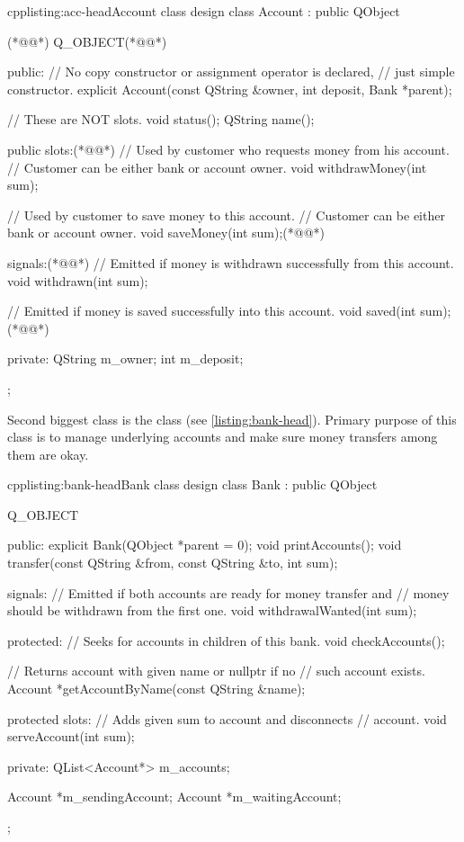 \begin{fdoccode}{cpp}{listing:acc-head}{Account class design}
class Account : public QObject {(*@\label{listing:qobj1}@*)
	Q_OBJECT(*@\label{listing:qobj2}@*)

    public:
		// No copy constructor or assignment operator is declared,
		// just simple constructor.
		explicit Account(const QString &owner,
						int deposit,
						Bank *parent);

		// These are NOT slots.
		void status();
		QString name();

    public slots:(*@\label{listing:slots1}@*)
		// Used by customer who requests money from his account.
		// Customer can be either bank or account owner.
		void withdrawMoney(int sum);

		// Used by customer to save money to this account.
		// Customer can be either bank or account owner.
		void saveMoney(int sum);(*@\label{listing:slots2}@*)

    signals:(*@\label{listing:signals1}@*)
		// Emitted if money is withdrawn successfully from this account.
		void withdrawn(int sum);

		// Emitted if money is saved successfully into this account.
		void saved(int sum);(*@\label{listing:signals2}@*)

    private:
		QString m_owner;
		int m_deposit;
};
\end{fdoccode}

Second biggest class is the class (see \autoref{listing:bank-head}). Primary purpose of this class is to manage underlying accounts and make sure money transfers among them are okay.

\begin{fdoccode}{cpp}{listing:bank-head}{Bank class design}
class Bank : public QObject {
    Q_OBJECT

  public:
    explicit Bank(QObject *parent = 0);
    void printAccounts();
    void transfer(const QString &from, const QString &to, int sum);

  signals:
    // Emitted if both accounts are ready for money transfer and
    // money should be withdrawn from the first one.
    void withdrawalWanted(int sum);

  protected:
    // Seeks for accounts in children of this bank.
    void checkAccounts();

    // Returns account with given name or nullptr if no
    // such account exists.
    Account *getAccountByName(const QString &name);

  protected slots:
    // Adds given sum to account and disconnects
    // account.
    void serveAccount(int sum);

  private:
    QList<Account*> m_accounts;

    Account *m_sendingAccount;
    Account *m_waitingAccount;
};
\end{fdoccode}

